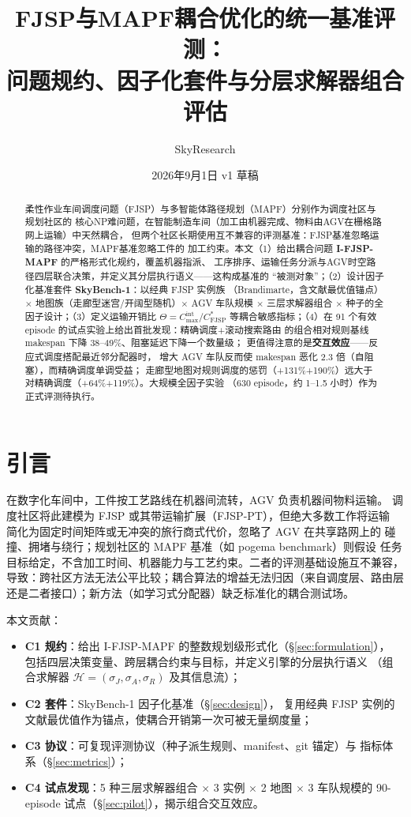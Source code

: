 \documentclass[UTF8,12pt,a4paper]{ctexart}
\title{FJSP与MAPF耦合优化的统一基准评测：\\问题规约、因子化套件与分层求解器组合评估}
\author{SkyResearch}
\date{2026年9月1日 \quad v1 草稿}
\newcommand{\Cmax}{C_{\max}}
\begin{document}
\maketitle

\begin{abstract}
柔性作业车间调度问题（FJSP）与多智能体路径规划（MAPF）分别作为调度社区与规划社区的
核心NP难问题，在智能制造车间（加工由机器完成、物料由AGV在栅格路网上运输）中天然耦合，
但两个社区长期使用互不兼容的评测基准：FJSP基准忽略运输的路径冲突，MAPF基准忽略工件的
加工约束。本文（1）给出耦合问题 \textbf{I-FJSP-MAPF} 的严格形式化规约，覆盖机器指派、
工序排序、运输任务分派与AGV时空路径四层联合决策，并定义其分层执行语义——这构成基准的
``被测对象''；（2）设计因子化基准套件 \textbf{SkyBench-1}：以经典 FJSP 实例族
（Brandimarte，含文献最优值锚点）$\times$ 地图族（走廊型迷宫/开阔型随机）$\times$
AGV 车队规模 $\times$ 三层求解器组合 $\times$ 种子的全因子设计；（3）定义运输开销比
$\Theta=\Cmax^{\text{int}}/C^{*}_{\text{FJSP}}$ 等耦合敏感指标；（4）在 91 个有效 episode 的试点实验上给出首批发现：精确调度+滚动搜索路由
的组合相对规则基线 makespan 下降 38--49\%、阻塞延迟下降一个数量级；
更值得注意的是\textbf{交互效应}——反应式调度搭配最近邻分配器时，
增大 AGV 车队反而使 makespan 恶化 2.3 倍（自阻塞），而精确调度单调受益；
走廊型地图对规则调度的惩罚（+131\%\raisebox{-.4ex}{$\sim$}+190\%）远大于
对精确调度（+64\%\raisebox{-.4ex}{$\sim$}+119\%）。大规模全因子实验
（630 episode，约 1--1.5 小时）作为正式评测待执行。
\end{abstract}

\section{引言}

在数字化车间中，工件按工艺路线在机器间流转，AGV 负责机器间物料运输。
调度社区将此建模为 FJSP 或其带运输扩展（FJSP-PT），但绝大多数工作将运输
简化为固定时间矩阵或无冲突的旅行商式代价，忽略了 AGV 在共享路网上的
碰撞、拥堵与绕行；规划社区的 MAPF 基准（如 pogema benchmark）则假设
任务目标给定，不含加工时间、机器能力与工艺约束。二者的评测基础设施互不兼容，
导致：跨社区方法无法公平比较；耦合算法的增益无法归因（来自调度层、路由层
还是二者接口）；新方法（如学习式分配器）缺乏标准化的耦合测试场。

本文贡献：
\begin{itemize}
  \item \textbf{C1 规约}：给出 I-FJSP-MAPF 的整数规划级形式化（\S\ref{sec:formulation}），
    包括四层决策变量、跨层耦合约束与目标，并定义引擎的分层执行语义
    （组合求解器 $\mathcal{H}=(\sigma_J,\sigma_A,\sigma_R)$ 及其信息流）；
  \item \textbf{C2 套件}：SkyBench-1 因子化基准（\S\ref{sec:design}），
    复用经典 FJSP 实例的文献最优值作为锚点，使耦合开销第一次可被无量纲度量；
  \item \textbf{C3 协议}：可复现评测协议（种子派生规则、manifest、git 锚定）与
    指标体系（\S\ref{sec:metrics}）；
  \item \textbf{C4 试点发现}：5 种三层求解器组合 $\times$ 3 实例 $\times$ 2 地图
    $\times$ 3 车队规模的 90-episode 试点（\S\ref{sec:pilot}），揭示组合交互效应。
\end{itemize}
\end{document}
